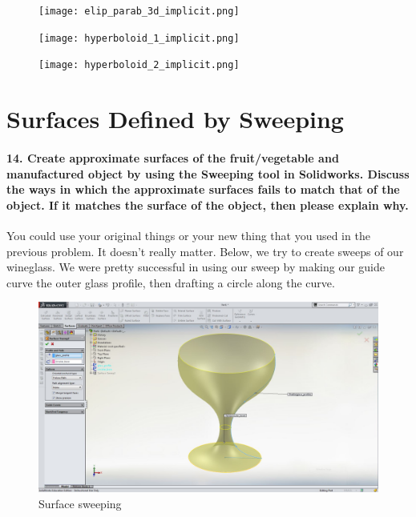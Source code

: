 \documentclass{article}
\begin{document}


\begin{figure} [h!]
    \centering
        \begin{minipage}{0.3\textwidth}
            \centering
            \texttt{[image: elip\_parab\_3d\_implicit.png]}
        \end{minipage}\hfill
        \begin{minipage}{0.3\textwidth}
            \centering
            \texttt{[image: hyperboloid\_1\_implicit.png]}
        \end{minipage}\hfill
        \begin{minipage}{0.3\textwidth}
            \centering
            \texttt{[image: hyperboloid\_2\_implicit.png]}
        \end{minipage}\hfill
\end{figure}

\section{Surfaces Defined by Sweeping}

\paragraph{14. Create approximate surfaces of the fruit/vegetable and manufactured object by using the Sweeping tool in Solidworks. Discuss the ways in which the approximate surfaces fails to match that of the object. If it matches the surface of the object, then please explain why.} 

You could use your original things or your new thing that you used in the previous problem. It doesn't really matter. Below, we try to create sweeps of our wineglass. We were pretty successful in using our sweep by making our guide curve the outer glass profile, then drafting a circle along the curve.

\begin{figure}[h!]
    \centering
    \includegraphics[width=1\textwidth]{figs_and_code/QEA_sweep}
    \caption{Surface sweeping}
\end{figure}
\end{document}
